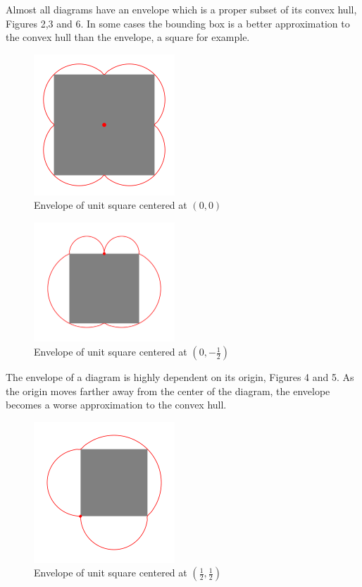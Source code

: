 \documentclass[11pt]{amsart}
\begin{document}
Almost all diagrams have an envelope which is a proper subset of its convex hull, Figures 2,3 and 6.
In some cases the bounding box is a better approximation to the convex hull than the envelope, a square
for example.

\begin{figure}[h]
\label{s00}
 \centering
\includegraphics[width=150pt]{sq1_0_0.png}
\caption{Envelope of unit square centered at $(0,0)$}
\end{figure}

\begin{figure}[h]
\label{s05}
 \centering
\includegraphics[width=150pt]{sq1_05.png}
\caption{Envelope of unit square centered at $(0,-\frac{1}{2})$}
\end{figure}

The envelope of a diagram is highly dependent on its origin, Figures 4 and 5.
As the origin moves farther away from the center of the diagram, the envelope becomes a 
worse approximation to the convex hull.

\begin{figure}[h]
\label{s55}
 \centering
\includegraphics[width=150pt]{sq1_55.png}
\caption{Envelope of unit square centered at $(\frac{1}{2}, \frac{1}{2})$}
\end{figure}
\end{document}
